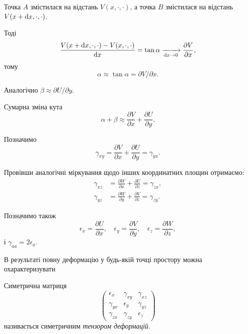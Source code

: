 \begin{enumerate}
	Точка $A$ змістилася на відстань $V(x, \cdot, \cdot)$, а точка $B$ змістилася на відстань $V(x + \mathop{}\!\mathrm{d} x, \cdot, \cdot)$. \medskip

	Тоді
	\begin{equation}
		\frac{V(x + \mathop{}\!\mathrm{d} x, \cdot, \cdot) -V(x, \cdot, \cdot)}{\mathop{}\!\mathrm{d} x} = \tan \alpha \xrightarrow[\mathop{}\!\mathrm{d} x \to 0]{} \frac{\partial V}{\partial x},
	\end{equation}
	тому
	\begin{equation}
		\alpha \approx \tan \alpha = \partial V / \partial x.
	\end{equation}

	Аналогічно $\beta \approx \partial U / \partial y$. \medskip

	Сумарна зміна кута
	\begin{equation}
		\alpha + \beta \approx \frac{\partial V}{\partial x} + \frac{\partial U}{\partial y}.
	\end{equation}
	
	Позначимо
	\begin{equation}
		\gamma_{x y} = \frac{\partial V}{\partial x} + \frac{\partial U}{\partial y} = \gamma_{y x}.
	\end{equation}
	
	Провівши аналогічні міркування щодо інших координатних площин отримаємо: 
	\begin{align}
		\gamma_{x z} &= \frac{\partial W}{\partial x} + \frac{\partial U}{\partial z} = \gamma_{z x}, \\
		\gamma_{y z} &= \frac{\partial W}{\partial y} + \frac{\partial V}{\partial z} = \gamma_{z y}.
	\end{align}

	Позначимо також
	\begin{equation}
		\epsilon_x = \frac{\partial U}{\partial x}, \quad \epsilon_y = \frac{\partial V}{\partial y}, \quad \epsilon_z = \frac{\partial W}{\partial z},
	\end{equation}
	і $\gamma_{a a} = 2 \epsilon_a$. \medskip

	В результаті повну деформацію у будь-якій точці простору можна охарактеризувати 
	\begin{definition}
		Симетрична матриця
		\begin{equation}
			\begin{pmatrix}
				\epsilon_x & \gamma_{x y} & \gamma_{x z} \\
				\gamma_{y x} & \epsilon_y & \gamma_{y z} \\
				\gamma_{z x} & \gamma_{z y} & \epsilon_z
			\end{pmatrix}
		\end{equation}
		називається симетричним \it{тензором деформацій}.
	\end{definition}
\end{enumerate}

